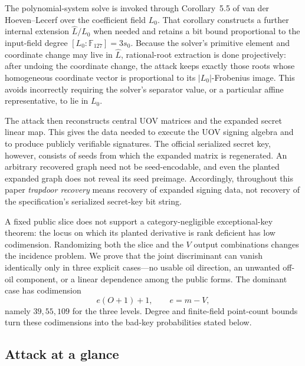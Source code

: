 \documentclass[10pt,a4paper]{article}
\newcommand{\F}{\mathbb F}
\begin{document}
The polynomial-system solve is invoked through Corollary~5.5 of van der Hoeven--Lecerf over the coefficient field $L_0$.  That corollary constructs a further internal extension $\widehat L/L_0$ when needed and retains a bit bound proportional to the input-field degree $[L_0:\F_{127}]=3s_0$.  Because the solver's primitive element and coordinate change may live in $\widehat L$, rational-root extraction is done projectively: after undoing the coordinate change, the attack keeps exactly those roots whose homogeneous coordinate vector is proportional to its $|L_0|$-Frobenius image.  This avoids incorrectly requiring the solver's separator value, or a particular affine representative, to lie in $L_0$.

The attack then reconstructs central UOV matrices and the expanded secret linear map.  This gives the data needed to execute the UOV signing algebra and to produce publicly verifiable signatures.  The official serialized secret key, however, consists of seeds from which the expanded matrix is regenerated.  An arbitrary recovered graph need not be seed-encodable, and even the planted expanded graph does not reveal its seed preimage.  Accordingly, throughout this paper \emph{trapdoor recovery} means recovery of expanded signing data, not recovery of the specification's serialized secret-key bit string.

A fixed public slice does not support a category-negligible exceptional-key theorem: the locus on which its planted derivative is rank deficient has low codimension.  Randomizing both the slice and the $V$ output combinations changes the incidence problem.  We prove that the joint discriminant can vanish identically only in three explicit cases---no usable oil direction, an unwanted off-oil component, or a linear dependence among the public forms.  The dominant case has codimension
\[
e(O+1)+1,\qquad e=m-V,
\]
namely $39,55,109$ for the three levels.  Degree and finite-field point-count bounds turn these codimensions into the bad-key probabilities stated below.

\subsection{Attack at a glance}
\end{document}
